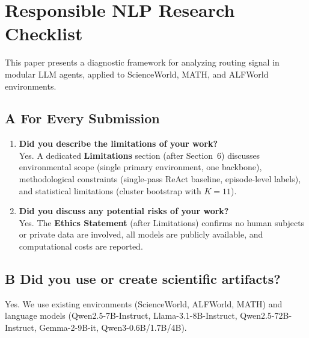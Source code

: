 
\section*{Responsible NLP Research Checklist}

This paper presents a diagnostic framework for analyzing routing signal in modular LLM agents, applied to ScienceWorld, MATH, and ALFWorld environments.

\subsection*{A \quad For Every Submission}

\begin{enumerate}
\item[\textbf{A1.}] \textbf{Did you describe the limitations of your work?}\\
Yes. A dedicated \textbf{Limitations} section (after Section~6) discusses environmental scope (single primary environment, one backbone), methodological constraints (single-pass ReAct baseline, episode-level labels), and statistical limitations (cluster bootstrap with $K{=}11$).

\item[\textbf{A2.}] \textbf{Did you discuss any potential risks of your work?}\\
Yes. The \textbf{Ethics Statement} (after Limitations) confirms no human subjects or private data are involved, all models are publicly available, and computational costs are reported.
\end{enumerate}

\subsection*{B \quad Did you use or create scientific artifacts?}

Yes. We use existing environments (ScienceWorld, ALFWorld, MATH) and language models (Qwen2.5-7B-Instruct, Llama-3.1-8B-Instruct, Qwen2.5-72B-Instruct, Gemma-2-9B-it, Qwen3-0.6B/1.7B/4B).


